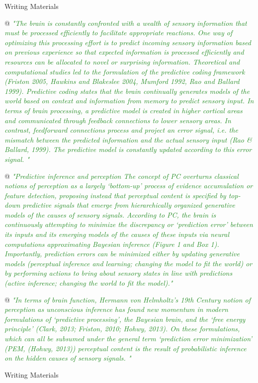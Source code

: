\documentclass[utf8]{article}
\newenvironment{writingMaterials}
			{	
			\begin{tcolorbox}[size=small, colframe=black!20!white, toprule=1mm]
				Writing Materials
			\end{tcolorbox}
			
			\begin{easylist}[itemize]		
			}
			{
			\end{easylist}
			\begin{tcolorbox}[size=small, bottomrule=1mm, halign=flush right, colframe=black!20!white]
				Writing Materials
			\end{tcolorbox}			
			}
\newcommand{\rewrite}[1]{\textcolor{ForestGreen}{\textit{"#1"}}\newline}
\begin{document}
\begin{writingMaterials}
				
				@ \rewrite{The brain is constantly confronted with a wealth of sensory information that must be processed efficiently to facilitate appropriate reactions. One way of optimizing this processing effort is to predict incoming sensory information based on previous experience so that expected information is processed efficiently and resources can be allocated to novel or surprising information. Theoretical and computational studies led to the formulation of the predictive coding framework (Friston 2005, Hawkins and Blakeslee 2004, Mumford 1992, Rao and Ballard 1999). Predictive coding states that the brain continually generates models of the world based on context and information from memory to predict sensory input. In terms of brain processing, a predictive model is created in higher cortical areas and communicated through feedback connections to lower sensory areas. In contrast, feedforward connections process and project an error signal, i.e. the mismatch between the predicted information and the actual sensory input (Rao \& Ballard, 1999). The predictive model is constantly updated according to this error signal. }


				
				
				@ \rewrite{Predictive inference and perception The concept of PC overturns classical notions of perception as a largely ‘bottom-up’ process of evidence accumulation or feature detection, proposing instead that perceptual content is speciﬁed by top-down predictive signals that emerge from hierarchically organized generative models of the causes of sensory signals. According to PC, the brain is continuously attempting to minimize the discrepancy or ‘prediction error’ between its inputs and its emerging models of the causes of these inputs via neural computations approximating Bayesian inference (Figure 1 and Box 1). Importantly, prediction errors can be minimized either by updating generative models (perceptual inference and learning; changing the model to ﬁt the world) or by performing actions to bring about sensory states in line with predictions (active inference; changing the world to ﬁt the model).}
				
				@ \rewrite{In terms of brain function, Hermann von Helmholtz’s 19th Century notion of perception as unconscious inference has found new momentum in modern formulations of ‘predictive processing’, the Bayesian brain, and the ‘free energy principle’ (Clark, 2013; Friston, 2010; Hohwy, 2013). On these formulations, which can all be subsumed under the general term ‘prediction error minimization’ (PEM, (Hohwy, 2013)) perceptual content is the result of probabilistic inference on the hidden causes of sensory signals. }
				

\end{writingMaterials}
\end{document}
